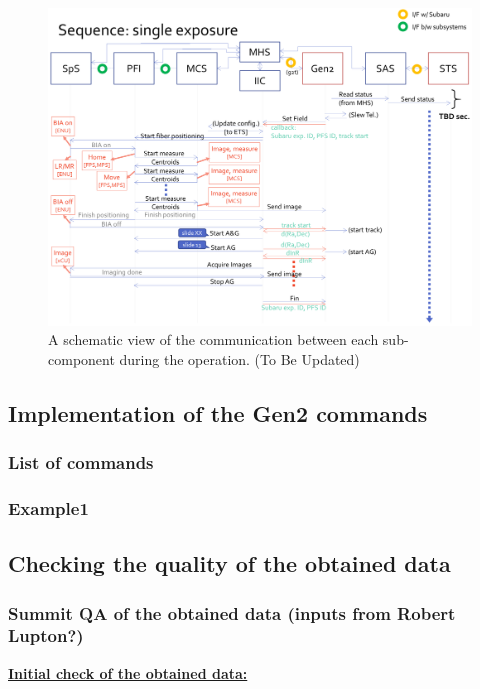 \documentclass[a4paper]{article}
\begin{document}
\begin{figure}[!htb]
\begin{center}
\includegraphics[scale=0.2]{./figures/PFS_sequence_process.pdf}
\end{center}
\caption{A schematic view of the communication between each sub-component during the operation. (To Be Updated)\label{fig:single_exposure_sequence2}}
\end{figure}

\subsection{Implementation of the Gen2 commands}
\subsubsection{List of commands}
\subsubsection{Example1}


\subsection{Checking the quality of the obtained data}
\subsubsection{Summit QA of the obtained data (inputs from Robert Lupton?)}
\noindent \underline{\textbf{Initial check of the obtained data:}}
\vspace{5pt}
\end{document}

